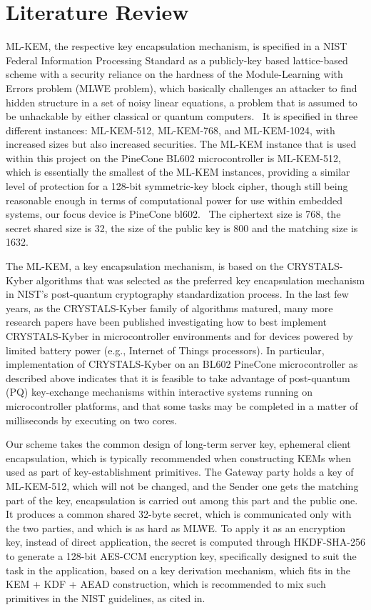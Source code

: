 \documentclass[a4paper]{scrartcl}
\begin{document}
    \section{Literature Review}
    ML-KEM, the respective key encapsulation mechanism, is specified in a NIST Federal Information Processing Standard as a publicly-key based lattice-based scheme with a security reliance on the hardness of the Module-Learning with Errors problem (MLWE problem), which basically challenges an attacker to find hidden structure in a set of noisy linear equations, a problem that is assumed to be unhackable by either classical or quantum computers.~\cite{Naya2025} It is specified in three different instances: ML-KEM-512, ML-KEM-768, and ML-KEM-1024, with increased sizes but also increased securities. The ML-KEM instance that is used within this project on the PineCone BL602 microcontroller is ML-KEM-512, which is essentially the smallest of the ML-KEM instances, providing a similar level of protection for a 128-bit symmetric-key block cipher, though still being reasonable enough in terms of computational power for use within embedded systems, our focus device is PineCone bl602.~\cite{Naya2025} The ciphertext size is 768, the secret shared size is 32, the size of the public key is 800 and the matching size is 1632.~\cite{Naya2025}
    
    The ML-KEM, a key encapsulation mechanism, is based on the CRYSTALS-Kyber algorithms that was selected as the preferred key encapsulation mechanism in NIST's post-quantum cryptography standardization process. In the last few years, as the CRYSTALS-Kyber family of algorithms matured, many more research papers have been published investigating how to best implement CRYSTALS-Kyber in microcontroller environments and for devices powered by limited battery power (e.g., Internet of Things processors). In particular, implementation of CRYSTALS-Kyber on an BL602 PineCone microcontroller as described above indicates that it is feasible to take advantage of post-quantum (PQ) key-exchange mechanisms within interactive systems running on microcontroller platforms, and that some tasks may be completed in a matter of milliseconds by executing on two cores.~\cite{al2025}
    
    Our scheme takes the common design of long-term server key, ephemeral client encapsulation, which is typically recommended when constructing KEMs when used as part of key-establishment primitives. The Gateway party holds a key of ML-KEM-512, which will not be changed, and the Sender one gets the matching part of the key, encapsulation is carried out among this part and the public one. It produces a common shared 32-byte secret, which is communicated only with the two parties, and which is as hard as MLWE. To apply it as an encryption key, instead of direct application, the secret is computed through HKDF-SHA-256 to generate a 128-bit AES-CCM encryption key, specifically designed to suit the task in the application, based on a key derivation mechanism, which fits in the KEM + KDF + AEAD construction, which is recommended to mix such primitives in the NIST guidelines, as cited in.~\cite{Naya2025}
\end{document}
